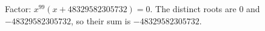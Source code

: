 Factor: $x^{99}\left(x+48329582305732\right)=0$. The distinct roots are $0$ and $-48329582305732$, so their sum is $\boxed{-48329582305732}$.
